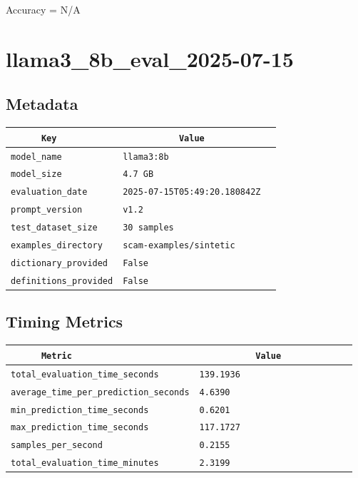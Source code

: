 \documentclass{article}
\begin{document}
\begin{center}
Accuracy = N/A
\end{center}

\section{llama3\_8b\_eval\_2025-07-15}
\subsection{Metadata}

\begin{center}
\begin{tabular}{l | l} \hline
    \verb|      Key      | & \verb|           Value           | \\ \hline
    \hline
    \verb|model_name    | & \verb|llama3:8b                    | \\ \hline
    \verb|model_size    | & \verb|4.7 GB                       | \\ \hline
    \verb|evaluation_date| & \verb|2025-07-15T05:49:20.180842Z  | \\ \hline
    \verb|prompt_version| & \verb|v1.2                         | \\ \hline
    \verb|test_dataset_size| & \verb|30 samples                   | \\ \hline
    \verb|examples_directory| & \verb|scam-examples/sintetic       | \\ \hline
    \verb|dictionary_provided| & \verb|False                        | \\ \hline
    \verb|definitions_provided| & \verb|False                        | \\ \hline
\end{tabular}
\end{center}

\subsection{Timing Metrics}

\begin{center}
\begin{tabular}{l | l} \hline
    \verb|      Metric     | & \verb|           Value           | \\ \hline
    \hline
    \verb|total_evaluation_time_seconds| & \verb|139.1936                     | \\ \hline
    \verb|average_time_per_prediction_seconds| & \verb|4.6390                       | \\ \hline
    \verb|min_prediction_time_seconds| & \verb|0.6201                       | \\ \hline
    \verb|max_prediction_time_seconds| & \verb|117.1727                     | \\ \hline
    \verb|samples_per_second| & \verb|0.2155                       | \\ \hline
    \verb|total_evaluation_time_minutes| & \verb|2.3199                       | \\ \hline
\end{tabular}
\end{center}
\end{document}
